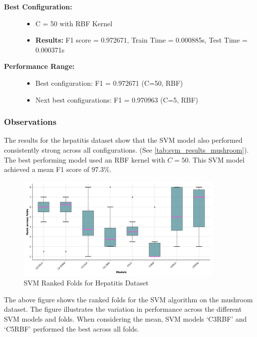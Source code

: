 \begin{description}
    \item[\textbf{Best Configuration:}]\leavevmode
        \begin{itemize}
            \item C = 50 with RBF Kernel
            \item \textbf{Results:} F1 score = 0.972671, Train Time = 0.000885s, Test Time = 0.000371s
        \end{itemize}
    
    \item[\textbf{Performance Range:}]\leavevmode
        \begin{itemize}
            \item Best configuration: F1 = 0.972671 (C=50, RBF)
            \item Next best configurations: F1 = 0.970963 (C=5, RBF)
        \end{itemize}
\end{description}

\subsubsection*{Observations}
The results for the hepatitis dataset show that the SVM model also performed consistently strong across all configurations.
(See \autoref{tab:svm_results_mushroom}).
The best performing model used an RBF kernel with $C=50$.
This SVM model achieved a mean F1 score of 97.3\%.

\begin{figure}
    \centering
    \includegraphics[width=0.9\textwidth]{figures/ranked_folds_SVM_hepatitis.png}
    \caption{SVM Ranked Folds for Hepatitis Dataset}
    \label{fig:ranked_folds_SVM_hepatitis}
\end{figure}

The above figure shows the ranked folds for the SVM algorithm on the mushroom dataset.
The figure illustrates the variation in performance across the different SVM models and folds.
When considering the mean, SVM models `C3RBF' and `C5RBF' performed the best across all folds.

